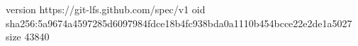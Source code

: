 version https://git-lfs.github.com/spec/v1
oid sha256:5a9674a4597285d6097984fdce18b4fc938bda0a1110b454bcce22e2de1a5027
size 43840
